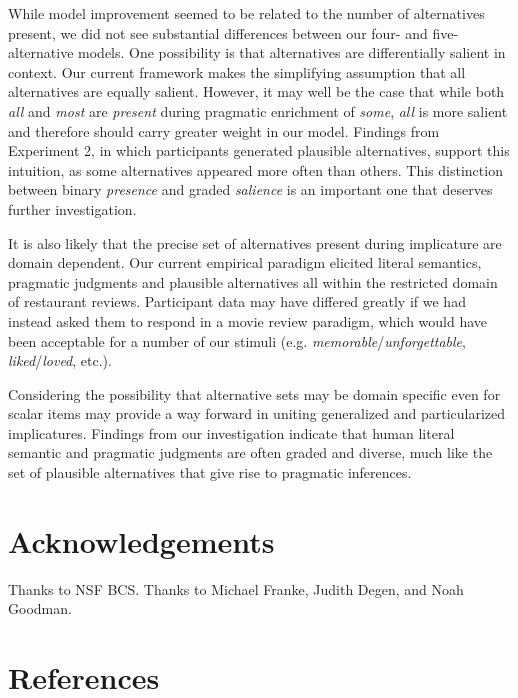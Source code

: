 \documentclass[10pt, letterpaper]{article}
\begin{document}
While model improvement seemed to be related to the number of
alternatives present, we did not see substantial differences between our
four- and five-alternative models. One possibility is that alternatives
are differentially salient in context. Our current framework makes the
simplifying assumption that all alternatives are equally salient.
However, it may well be the case that while both \emph{all} and
\emph{most} are \emph{present} during pragmatic enrichment of
\emph{some}, \emph{all} is more salient and therefore should carry
greater weight in our model. Findings from Experiment 2, in which
participants generated plausible alternatives, support this intuition,
as some alternatives appeared more often than others. This distinction
between binary \emph{presence} and graded \emph{salience} is an
important one that deserves further investigation.

It is also likely that the precise set of alternatives present during
implicature are domain dependent. Our current empirical paradigm
elicited literal semantics, pragmatic judgments and plausible
alternatives all within the restricted domain of restaurant reviews.
Participant data may have differed greatly if we had instead asked them
to respond in a movie review paradigm, which would have been acceptable
for a number of our stimuli (e.g. \emph{memorable}/\emph{unforgettable},
\emph{liked}/\emph{loved}, etc.).

Considering the possibility that alternative sets may be domain specific
even for scalar items may provide a way forward in uniting generalized
and particularized implicatures. Findings from our investigation
indicate that human literal semantic and pragmatic judgments are often
graded and diverse, much like the set of plausible alternatives that
give rise to pragmatic inferences.

\section{Acknowledgements}\label{acknowledgements}

Thanks to NSF BCS. Thanks to Michael Franke, Judith Degen, and Noah
Goodman.

\section{References}\label{references}

\setlength{\parindent}{-0.1in} \setlength{\leftskip}{0.125in} \noindent
\end{document}
